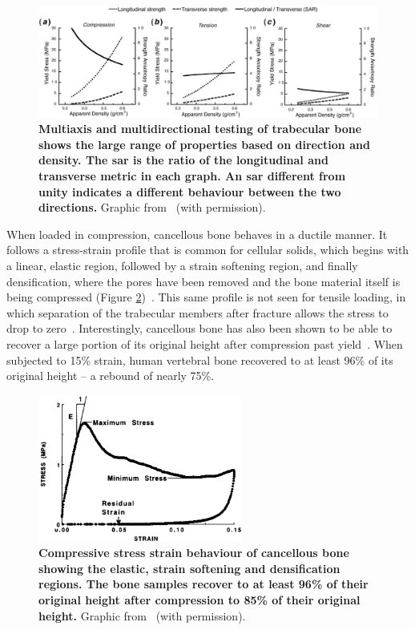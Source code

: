 \begin{figure}
\centering
\includegraphics[width=\linewidth]{./intro/Figures/Keaveny_2001_trabec}
\caption[Cancellous bone failure properties]{\textbf{Multiaxis and multidirectional testing of trabecular bone shows the large range of properties based on direction and density. The \acf{sar} is the ratio of the longitudinal and transverse metric in each graph. An \ac{sar} different from unity indicates a different behaviour between the two directions.} Graphic from~\citet{keaveny_biomechanics_2001} (with permission).}
\label{fig:trabec_loading}
\end{figure}

When loaded in compression, cancellous bone behaves in a ductile manner.
It follows a stress-strain profile that is common for cellular solids, which begins with a linear, elastic region, followed by a strain softening region, and finally densification, where the pores have been removed and the bone material itself is being compressed (Figure \ref{fig:cancellous_stressStrain})~\citep{fyhrie_failure_1994, carter_compressive_1977}.
This same profile is not seen for tensile loading, in which separation of the trabecular members after fracture allows the stress to drop to zero~\citep{carter_tensile_1980}.
Interestingly, cancellous bone has also been shown to be able to recover a large portion of its original height after compression past yield~\citep{fyhrie_failure_1994}.
When subjected to 15\% strain, human vertebral bone recovered to at least 96\% of its original height -- a rebound of nearly 75\%.

\begin{figure}
\centering
\includegraphics[width=0.6\textwidth]{./intro/Figures/Fyhrie_1994_stressStrain}
\caption[Cancellous bone stress-strain curve]{\textbf{Compressive stress strain behaviour of cancellous bone showing the elastic, strain softening and densification regions. The bone samples recover to at least 96\% of their original height after compression to 85\% of their original height.} Graphic from~\citet{fyhrie_failure_1994} (with permission).}
\label{fig:cancellous_stressStrain}
\end{figure}

